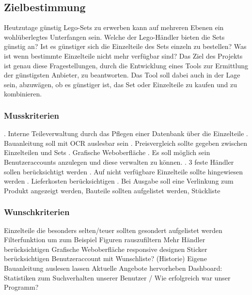 \subsection{Zielbestimmung}

Heutzutage günstig Lego-Sets zu erwerben kann auf mehreren Ebenen ein wohlüberlegtes Unterfangen sein. Welche der Lego-Händler bieten die Sets günstig an? Ist es günstiger sich die Einzelteile des Sets einzeln zu bestellen? Was ist wenn bestimmte Einzelteile nicht mehr verfügbar sind? \newline
Das Ziel des Projekts ist genau diese Fragestellungen, durch die Entwicklung eines Tools zur Ermittlung der günstigsten Anbieter, zu beantworten. Das Tool soll dabei auch in der Lage sein, abzuwägen, ob es günstiger ist, das Set oder Einzelteile zu kaufen und zu kombinieren.

\subsubsection{Musskriterien}
. Interne Teileverwaltung durch das Pflegen einer Datenbank über die Einzelteile \newline 
{}. Bauanleitung soll mit OCR auslesbar sein \newline
{}. Preisvergleich sollte gegeben zwischen Einzelteilen und Sets \newline
{}. Grafische Weboberfläche \newline
{}. Es soll möglich sein Benutzeraccounts anzulegen und diese verwalten zu können. \newline
{}. 3 feste Händler sollen berücksichtigt werden \newline
{}. Auf nicht verfügbare Einzelteile sollte hingewiesen werden \newline
{}. Lieferkosten berücksichtigen \newline 
{}. Bei Ausgabe soll eine Verlinkung zum Produkt angezeigt werden, Bauteile sollten aufgelistet werden, Stückliste \newline

\subsubsection{Wunschkriterien}
Einzelteile die besonders selten/teuer sollten gesondert aufgelistet werden \newline
Filterfunktion um zum Beispiel Figuren rauszufiltern \newline
Mehr Händler berücksichtigen \newline
Grafische Weboberfläche responsive designen \newline
Sticker berücksichtigen \newline
Benutzeraccount mit Wunschliste? (Historie) \newline
Eigene Bauanleitung auslesen lassen \newline
Aktuelle Angebote hervorheben \newline
Dashboard: Statistiken zum Suchverhalten unserer Benutzer / Wie erfolgreich war unser Programm? \newline

